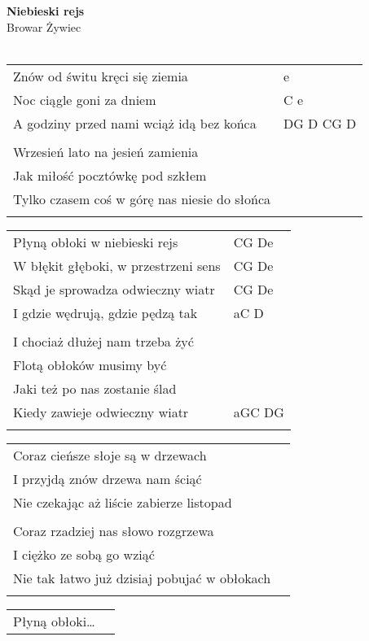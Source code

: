 \documentclass[a5paper]{article}
\begin{document}


\noindent
\fontsize{12pt}{15pt}\selectfont
\textbf{Niebieski rejs} \\
\fontsize{8pt}{10pt}\selectfont
Browar Żywiec \\ \\
\fontsize{10pt}{12pt}\selectfont
{}
\begin{tabular}{@{}p{8.00cm}p{3cm}@{}}
\noindent
Znów od świtu kręci się ziemia & e \\
Noc ciągle goni za dniem & C e \\
A godziny przed nami wciąż idą bez końca & DG D CG D \\ \\
 
Wrzesień lato na jesień zamienia \\
Jak miłość pocztówkę pod szkłem \\
Tylko czasem coś w górę nas niesie do słońca \\ \\
\end{tabular}

\noindent
\begin{tabular}{@{}p{7.00cm}p{3cm}@{}}
Płyną obłoki w niebieski rejs & CG De \\
W błękit głęboki, w przestrzeni sens & CG De \\
Skąd je sprowadza odwieczny wiatr & CG De \\
I gdzie wędrują, gdzie pędzą tak & aC D \\ \\

I chociaż dłużej nam trzeba żyć \\
Flotą obłoków musimy być \\
Jaki też po nas zostanie ślad \\
Kiedy zawieje odwieczny wiatr & aGC DG \\ \\
\end{tabular}

\noindent
\begin{tabular}{@{}p{7.00cm}p{3cm}@{}}
Coraz cieńsze słoje są w drzewach \\
I przyjdą znów drzewa nam ściąć \\
Nie czekając aż liście zabierze listopad \\ \\
 
Coraz rzadziej nas słowo rozgrzewa \\
I ciężko ze sobą go wziąć \\
Nie tak łatwo już dzisiaj pobujać w obłokach \\ \\
\end{tabular}

\noindent
\begin{tabular}{@{}p{7.00cm}p{3cm}@{}} 
Płyną obłoki… \\
\end{tabular}
\end{document}
